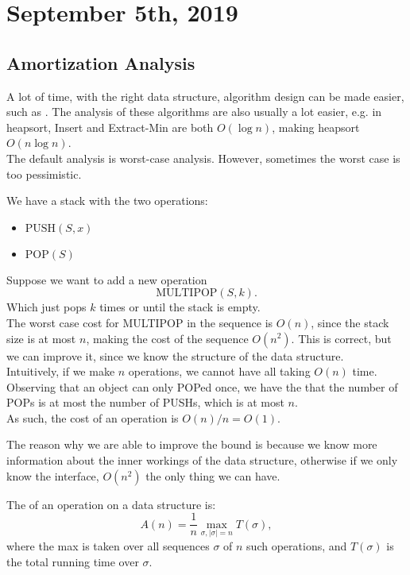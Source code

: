 \documentclass[../main/main.tex]{subfiles}
\begin{document}
\section{September  5th, 2019}
\subsection{Amortization Analysis}
A lot of time, with the right data structure, algorithm design can be made easier, such as . The analysis of these algorithms are also usually a lot easier, e.g. in heapsort, Insert and Extract-Min are both $O(\log n)$, making heapsort $O(n\log n)$.\\

The default analysis is worst-case analysis. However, sometimes the worst case is too pessimistic. 
\begin{example}
	We have a stack with the two operations:
	\begin{itemize}
		\item $\text{PUSH}(S,x)$ 
		\item $\text{POP}(S)$
	\end{itemize}
	Suppose we want to add a new operation \[
		\text{MULTIPOP}(S,k)
	.\] Which just pops $k$ times or until the stack is empty.\\

	The worst case cost for MULTIPOP in the sequence is $O(n)$, since the stack size is at most $n$, making the cost of the sequence $O(n^2)$. This is correct, but we can improve it, since we know the structure of the data structure. \\

	Intuitively, if we make $n$ operations, we cannot have all taking $O(n)$ time. Observing that an object can only POPed once, we have the that the number of POPs is at most the number of PUSHs, which is at most $n$.\\
	
	As such, the  cost of an operation is $O(n)/n=O(1)$.
\end{example}
\begin{remark}
	The reason why we are able to improve the bound is because we know more information about the inner workings of the data structure, otherwise if we only know the interface, $O(n^2)$ the only thing we can have.
\end{remark}
\begin{definition}
	The  of an operation on a data structure is: \[
		A(n)=\frac{1}{n}\max_{\sigma,\left| \sigma \right| =n}T(\sigma	)
	,\] where the max is taken over all sequences $\sigma$ of $n$ such operations, and $T(\sigma)$ is the total running time over $\sigma$.
\end{definition}
\end{document}
